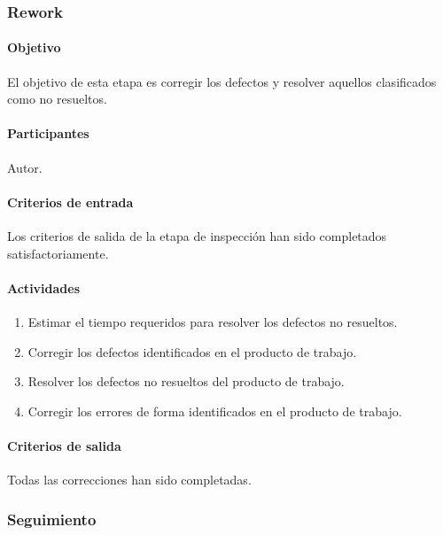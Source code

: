 \subsubsection{Rework}

\paragraph{Objetivo\\}

El objetivo de esta etapa es corregir los defectos y resolver aquellos clasificados como no resueltos.

\paragraph{Participantes\\}

Autor.

\paragraph{Criterios de entrada\\}

Los criterios de salida de la etapa de inspección han sido completados satisfactoriamente.

\paragraph{Actividades}

\begin{enumerate}
	\item
		Estimar el tiempo requeridos para resolver los defectos no resueltos.
	\item
		Corregir los defectos identificados en el producto de trabajo.
	\item
		Resolver los defectos no resueltos del producto de trabajo.
	\item
		Corregir los errores de forma identificados en el producto de trabajo.
\end{enumerate}

\paragraph{Criterios de salida\\}

Todas las correcciones han sido completadas. 

\subsubsection{Seguimiento}


